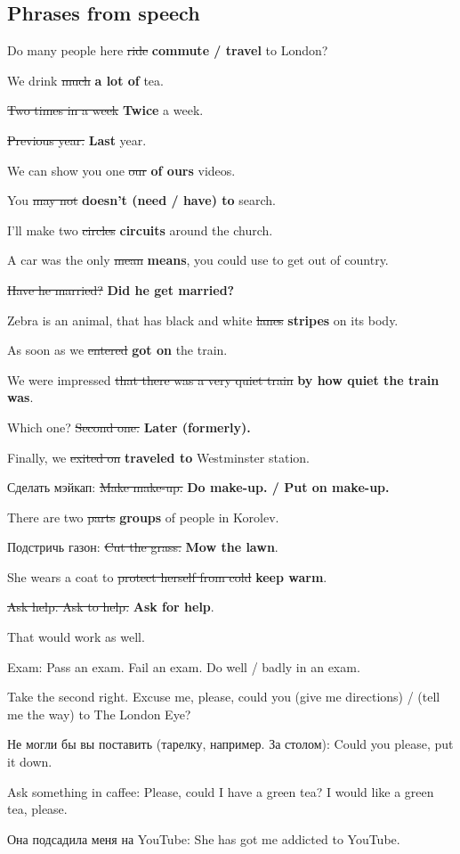 \documentclass[10pt,a4paper]{article}
\newlength{\OriginalParIndent}
\begin{document}
\subsection{Phrases from speech}
\begin{description}[leftmargin=\OriginalParIndent,style=nextline,before={\renewcommand\makelabel[1]{##1 ~--}}]
\item[] Do many people here \sout{ride} \textbf{commute / travel} to London?
\item[] We drink \sout{much} \textbf{a lot of} tea.
\item[] \sout{Two times in a week} \textbf{Twice} a week.
\item[] \sout{Previous year.} \textbf{Last} year.
\item[] We can show you one \sout{our} \textbf{of ours} videos.
\item[] You \sout{may not} \textbf{doesn't (need / have) to} search.
\item[] I'll make two \sout{circles} \textbf{circuits} around the church.
\item[] A car was the only \sout{mean} \textbf{means}, you could use to get out of country.
\item[] \sout{Have he married?} \textbf{Did he get married?}
\item[] Zebra is an animal, that has black and white \sout{lanes} \textbf{stripes} on its body.
\item[] As soon as we \sout{entered} \textbf{got on} the train.
\item[] We were impressed \sout{that there was a very quiet train} \textbf{by
        how quiet the train was}.
\item[] Which one? \sout{Second one.} \textbf{Later (formerly).}
\item[] Finally, we \sout{exited on} \textbf{traveled to} Westminster station.
\item[] Сделать мэйкап: \sout{Make make-up.} \textbf{Do make-up. / Put on make-up.}
\item[] There are two \sout{parts} \textbf{groups} of people in Korolev.
\item[] Подстричь газон: \sout{Cut the grass.} \textbf{Mow the lawn}.
\item[] She wears a coat to \sout{protect herself from cold} \textbf{keep warm}.
\item[] \sout{Ask help. Ask to help.} \textbf{Ask for help}.

\item[] That would work as well.
\item[] Exam: Pass an exam. Fail an exam. Do well / badly in an exam.
\item[] Take the second right. Excuse me, please, could you (give me directions) /
        (tell me the way) to The London Eye?
\item[] Не могли бы вы поставить (тарелку, например. За столом): Could you please, put it down.
\item[] Ask something in caffee: Please, could I have a green tea? I would like a green tea, please.
\item[] Она подсадила меня на YouTube: She has got me addicted to YouTube.
\end{description}
\end{document}

